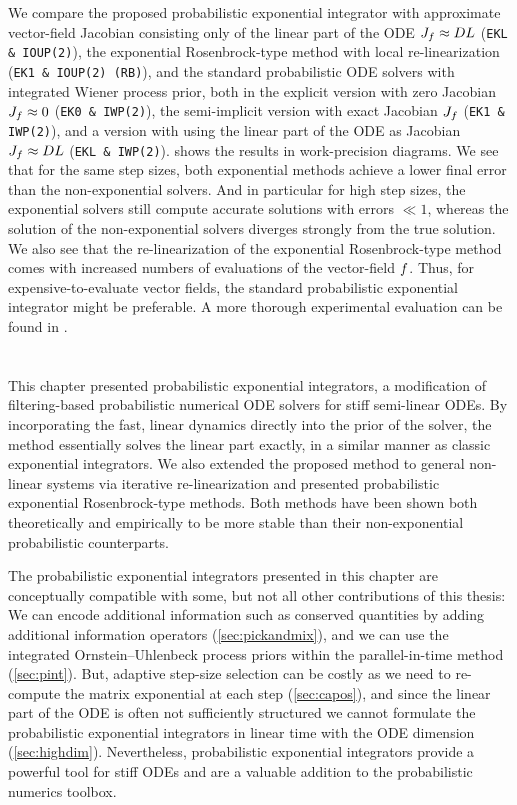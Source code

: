 \documentclass{mimosis}
\begin{document}
We compare the proposed probabilistic exponential integrator with approximate vector-field Jacobian consisting only of the linear part of the ODE \(\jac{\vf} \approx DL\) (\texttt{EKL \& IOUP(2)}),
the exponential Rosenbrock-type method with local re-linearization (\texttt{EK1 \& IOUP(2) (RB)}),
and the standard probabilistic ODE solvers with integrated Wiener process prior, both in
the explicit version with zero Jacobian \(\jac{\vf} \approx 0\) (\texttt{EK0 \& IWP(2)}),
the semi-implicit version with exact Jacobian \(\jac{\vf}\) (\texttt{EK1 \& IWP(2)}),
and a version with using the linear part of the ODE as Jacobian \(\jac{\vf} \approx DL\) (\texttt{EKL \& IWP(2)}).
shows the results in work-precision diagrams.
We see that for the same step sizes, both exponential methods achieve a lower final error than the non-exponential solvers.
And in particular for high step sizes, the exponential solvers still compute accurate solutions with errors \(\ll 1\), whereas the solution of the non-exponential solvers diverges strongly from the true solution.
We also see that the re-linearization of the exponential Rosenbrock-type method comes with increased numbers of evaluations of the vector-field \(\vf\).
Thus, for expensive-to-evaluate vector fields, the standard probabilistic exponential integrator might be preferable.
A more thorough experimental evaluation can be found in
\probexpint{}.
\section{\wrapupsec{}}
\label{sec:orge0ba21c}
This chapter presented probabilistic exponential integrators, a modification of filtering-based probabilistic numerical ODE solvers for stiff semi-linear ODEs.
By incorporating the fast, linear dynamics directly into the prior of the solver, the method essentially solves the linear part exactly, in a similar manner as classic exponential integrators.
We also extended the proposed method to general non-linear systems via iterative re-linearization and presented probabilistic exponential Rosenbrock-type methods.
Both methods have been shown both theoretically and empirically to be more stable than their non-exponential probabilistic counterparts.

The probabilistic exponential integrators presented in this chapter are conceptually compatible with some, but not all other contributions of this thesis:
We can encode additional information such as conserved quantities by adding additional information operators (\cref{sec:pickandmix}), and we can use the integrated Ornstein--Uhlenbeck process priors within the parallel-in-time method (\cref{sec:pint}).
But, adaptive step-size selection can be costly as we need to re-compute the matrix exponential at each step (\cref{sec:capos}),
and since the linear part of the ODE is often not sufficiently structured we cannot formulate the probabilistic exponential integrators in linear time with the ODE dimension (\cref{sec:highdim}).
Nevertheless, probabilistic exponential integrators provide a powerful tool for stiff ODEs and are a valuable addition to the probabilistic numerics toolbox.
\end{document}
